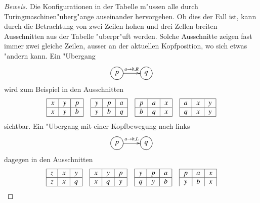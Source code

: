 \begin{proof}[Beweis]
Die Konfigurationen in der Tabelle m"ussen alle durch
Turingmaschinen"uberg"ange auseinander hervorgehen. Ob dies
der Fall ist, kann durch die Betrachtung von zwei Zeilen
hohen und drei Zellen breiten Ausschnitten aus der Tabelle
"uberpr"uft werden. Solche Ausschnitte zeigen fast immer zwei
gleiche Zeilen, ausser an der aktuellen Kopfposition, wo
sich etwas "andern kann. Ein "Ubergang
\[
\entrymodifiers={++[o][F]}
\xymatrix{
p\ar[r]^{a\to b,R}
	&q
}
\]
wird zum Beispiel in den Ausschnitten
\[
\begin{tabular}{|c|c|c|}
\hline
$x$&$y$&$p$\\
\hline
$x$&$y$&$b$\\
\hline
\end{tabular}
\quad
\begin{tabular}{|c|c|c|}
\hline
$y$&$p$&$a$\\
\hline
$y$&$b$&$q$\\
\hline
\end{tabular}
\quad
\begin{tabular}{|c|c|c|}
\hline
$p$&$a$&$x$\\
\hline
$b$&$q$&$x$\\
\hline
\end{tabular}
\quad
\begin{tabular}{|c|c|c|}
\hline
$a$&$x$&$y$\\
\hline
$q$&$x$&$y$\\
\hline
\end{tabular}
\]
sichtbar. Ein "Ubergang mit einer Kopfbewegung nach links
\[
\entrymodifiers={++[o][F]}
\xymatrix{
p\ar[r]^{a\to b,L}
	&q
}
\]
dagegen in den Ausschnitten
\[
\begin{tabular}{|c|c|c|}
\hline
$z$&$x$&$y$\\
\hline
$z$&$x$&$q$\\
\hline
\end{tabular}
\quad
\begin{tabular}{|c|c|c|}
\hline
$x$&$y$&$p$\\
\hline
$x$&$q$&$y$\\
\hline
\end{tabular}
\quad
\begin{tabular}{|c|c|c|}
\hline
$y$&$p$&$a$\\
\hline
$q$&$y$&$b$\\
\hline
\end{tabular}
\quad
\begin{tabular}{|c|c|c|}
\hline
$p$&$a$&$x$\\
\hline
$y$&$b$&$x$\\

\end{tabular}\]
\end{proof}
